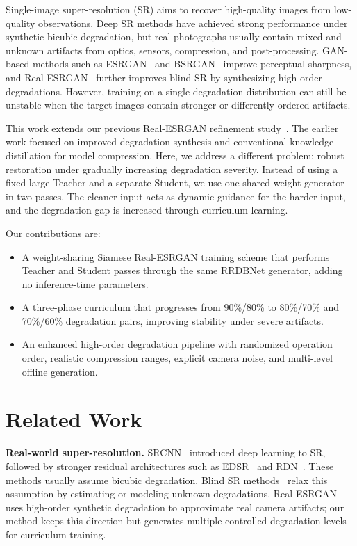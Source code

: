 \documentclass[runningheads]{llncs}
\begin{document}
Single-image super-resolution (SR) aims to recover high-quality images from low-quality observations. Deep SR methods have achieved strong performance under synthetic bicubic degradation, but real photographs usually contain mixed and unknown artifacts from optics, sensors, compression, and post-processing. GAN-based methods such as ESRGAN~\cite{wang2018esrgan} and BSRGAN~\cite{zhang2021designing} improve perceptual sharpness, and Real-ESRGAN~\cite{wang2021realesrgan} further improves blind SR by synthesizing high-order degradations. However, training on a single degradation distribution can still be unstable when the target images contain stronger or differently ordered artifacts.

This work extends our previous Real-ESRGAN refinement study~\cite{11309534}. The earlier work focused on improved degradation synthesis and conventional knowledge distillation for model compression. Here, we address a different problem: robust restoration under gradually increasing degradation severity. Instead of using a fixed large Teacher and a separate Student, we use one shared-weight generator in two passes. The cleaner input acts as dynamic guidance for the harder input, and the degradation gap is increased through curriculum learning.

Our contributions are:
\begin{itemize}
    \item A weight-sharing Siamese Real-ESRGAN training scheme that performs Teacher and Student passes through the same RRDBNet generator, adding no inference-time parameters.
    \item A three-phase curriculum that progresses from 90\%/80\% to 80\%/70\% and 70\%/60\% degradation pairs, improving stability under severe artifacts.
    \item An enhanced high-order degradation pipeline with randomized operation order, realistic compression ranges, explicit camera noise, and multi-level offline generation.
\end{itemize}

\section{Related Work}

\noindent\textbf{Real-world super-resolution.}
SRCNN~\cite{dong2014learning} introduced deep learning to SR, followed by stronger residual architectures such as EDSR~\cite{lim2017enhanced} and RDN~\cite{zhang2018residualdensenetworkimage}. These methods usually assume bicubic degradation. Blind SR methods~\cite{zhang2018learning,luo2020unfolding,gu2019blind} relax this assumption by estimating or modeling unknown degradations. Real-ESRGAN~\cite{wang2021realesrgan} uses high-order synthetic degradation to approximate real camera artifacts; our method keeps this direction but generates multiple controlled degradation levels for curriculum training.
\end{document}
